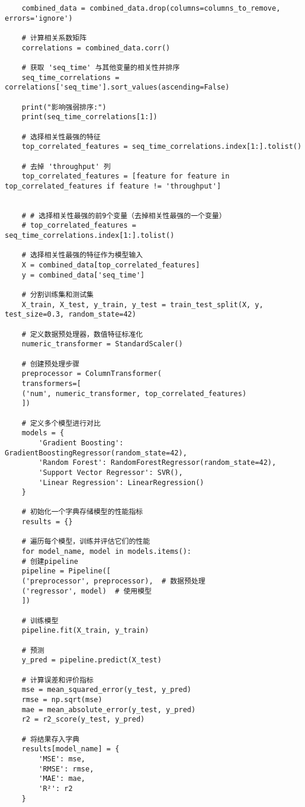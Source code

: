 \documentclass[bwprint,fontset=windows]{gmcmthesis}
\begin{document}
\begin{lstlisting}
	combined_data = combined_data.drop(columns=columns_to_remove, errors='ignore')
	
	# 计算相关系数矩阵
	correlations = combined_data.corr()
	
	# 获取 'seq_time' 与其他变量的相关性并排序
	seq_time_correlations = correlations['seq_time'].sort_values(ascending=False)
	
	print("影响强弱排序:")
	print(seq_time_correlations[1:])
	
	# 选择相关性最强的特征
	top_correlated_features = seq_time_correlations.index[1:].tolist()
	
	# 去掉 'throughput' 列
	top_correlated_features = [feature for feature in top_correlated_features if feature != 'throughput']
	
	
	# # 选择相关性最强的前9个变量（去掉相关性最强的一个变量）
	# top_correlated_features = seq_time_correlations.index[1:].tolist()
	
	# 选择相关性最强的特征作为模型输入
	X = combined_data[top_correlated_features]
	y = combined_data['seq_time']
	
	# 分割训练集和测试集
	X_train, X_test, y_train, y_test = train_test_split(X, y, test_size=0.3, random_state=42)
	
	# 定义数据预处理器，数值特征标准化
	numeric_transformer = StandardScaler()
	
	# 创建预处理步骤
	preprocessor = ColumnTransformer(
	transformers=[
	('num', numeric_transformer, top_correlated_features)
	])
	
	# 定义多个模型进行对比
	models = {
		'Gradient Boosting': GradientBoostingRegressor(random_state=42),
		'Random Forest': RandomForestRegressor(random_state=42),
		'Support Vector Regressor': SVR(),
		'Linear Regression': LinearRegression()
	}
	
	# 初始化一个字典存储模型的性能指标
	results = {}
	
	# 遍历每个模型，训练并评估它们的性能
	for model_name, model in models.items():
	# 创建pipeline
	pipeline = Pipeline([
	('preprocessor', preprocessor),  # 数据预处理
	('regressor', model)  # 使用模型
	])
	
	# 训练模型
	pipeline.fit(X_train, y_train)
	
	# 预测
	y_pred = pipeline.predict(X_test)
	
	# 计算误差和评价指标
	mse = mean_squared_error(y_test, y_pred)
	rmse = np.sqrt(mse)
	mae = mean_absolute_error(y_test, y_pred)
	r2 = r2_score(y_test, y_pred)
	
	# 将结果存入字典
	results[model_name] = {
		'MSE': mse,
		'RMSE': rmse,
		'MAE': mae,
		'R²': r2
	}
	

\end{lstlisting}
\end{document}

